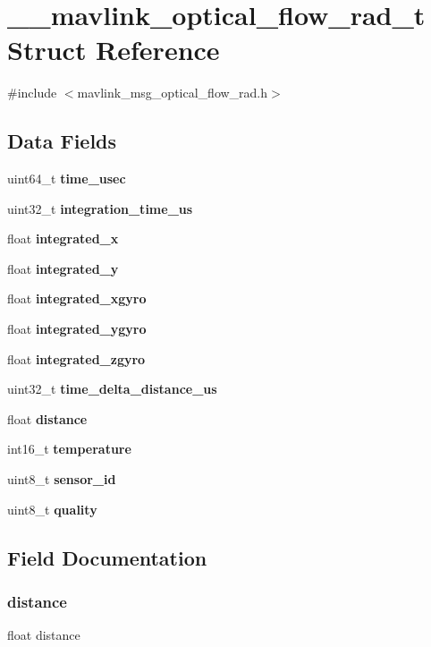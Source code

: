 \section{\+\_\+\+\_\+mavlink\+\_\+optical\+\_\+flow\+\_\+rad\+\_\+t Struct Reference}
\label{struct____mavlink__optical__flow__rad__t}


{\ttfamily \#include $<$mavlink\+\_\+msg\+\_\+optical\+\_\+flow\+\_\+rad.\+h$>$}

\subsection*{Data Fields}
\begin{DoxyCompactItemize}
\item 
uint64\+\_\+t \textbf{ time\+\_\+usec}
\item 
uint32\+\_\+t \textbf{ integration\+\_\+time\+\_\+us}
\item 
float \textbf{ integrated\+\_\+x}
\item 
float \textbf{ integrated\+\_\+y}
\item 
float \textbf{ integrated\+\_\+xgyro}
\item 
float \textbf{ integrated\+\_\+ygyro}
\item 
float \textbf{ integrated\+\_\+zgyro}
\item 
uint32\+\_\+t \textbf{ time\+\_\+delta\+\_\+distance\+\_\+us}
\item 
float \textbf{ distance}
\item 
int16\+\_\+t \textbf{ temperature}
\item 
uint8\+\_\+t \textbf{ sensor\+\_\+id}
\item 
uint8\+\_\+t \textbf{ quality}
\end{DoxyCompactItemize}


\subsection{Field Documentation}
\mbox{\label{struct____mavlink__optical__flow__rad__t_a06f14a9abd47b91465f895d5259cdc1b}} 
\subsubsection{distance}
{\footnotesize\ttfamily float distance}


